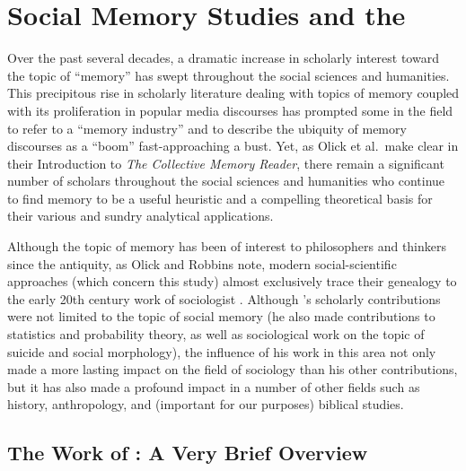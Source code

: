 \hypertarget{social-memory-studies-and-the-rwb}{%
\chapter{Social Memory Studies and the
\RwB}\label{social-memory-studies-and-the-rwb}}

Over the past several decades, a dramatic increase in scholarly interest
toward the topic of ``memory'' has swept throughout the social sciences
and humanities. This precipitous rise in scholarly literature dealing
with topics of memory coupled with its proliferation in popular media
discourses has prompted some in the field to refer to a ``memory
industry'' and to describe the ubiquity of memory discourses as a
``boom'' fast-approaching a
bust.\autocites{rosenfeld_jmh2009}{winter2006}{berliner_aq2005}{confino_ahr1997}
Yet, as Olick et al.~make clear in their Introduction to \emph{The
Collective Memory Reader}, there remain a significant number of scholars
throughout the social sciences and humanities who continue to find
memory to be a useful heuristic and a compelling theoretical basis for
their various and sundry analytical
applications.\autocite[3--6]{olick_olick-etal2011}

Although the topic of memory has been of interest to philosophers and
thinkers since the antiquity,\autocite{carruthers_radstone-schwarz2011}
as Olick and Robbins note, modern social-scientific approaches (which
concern this study) almost exclusively trace their genealogy to the
early 20th century work of sociologist
\Halbwachs.\autocites[106]{olick-robbins_ars1998}[It
should be noted, however, that \halbwachs was not the
first or only person to do work on memory or the impact of social
structures on memory. See][8--36]{olick_olick-etal2011} Although
\halbwachs's scholarly contributions were not limited to
the topic of social memory (he also made contributions to statistics and
probability theory, as well as sociological work on the topic of suicide
and social morphology), the influence of his work in this area not only
made a more lasting impact on the field of sociology than his other
contributions, but it has also made a profound impact in a number of
other fields such as history, anthropology, and (important for our
purposes) biblical studies.\autocite[13--20]{coser_halbwachs1992}

\hypertarget{the-work-of-halbwachs-a-very-brief-overview}{%
\section{The Work of \Halbwachs: A Very Brief
Overview}\label{the-work-of-halbwachs-a-very-brief-overview}}

